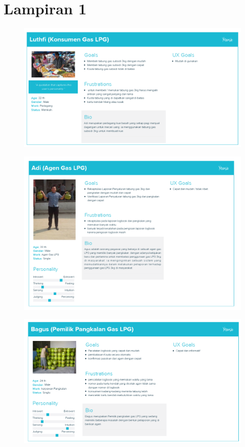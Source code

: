 \chapter*{Lampiran 1}
\begin{figure}[H]
	\center
	\includegraphics [width = 15cm]{gambar/persona/konsumen}
\end{figure}

\begin{figure}[H]
	\center
	\includegraphics [width = 15cm]{gambar/persona/agen}
\end{figure}

\begin{figure}[H]
	\center
	\includegraphics [width = 15cm]{gambar/persona/pangkalan}
\end{figure}
